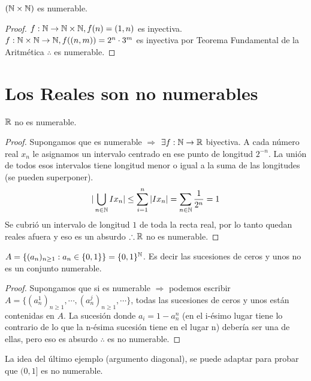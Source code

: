 \begin{eg}
    $(\mathbb{N} \times \mathbb{N})$ es numerable.
    \begin{proof}
        $f: \mathbb{N} \to \mathbb{N}\times \mathbb{N}, f(n)=(1, n)$ es inyectiva.
        $f: \mathbb{N}\times \mathbb{N} \to \mathbb{N} , f((n, m))= 2^n \cdot 3^m$ es inyectiva por Teorema Fundamental de la Aritmética $\therefore$ es numerable.
    \end{proof}
\end{eg}

\section{Los Reales son no numerables}

\begin{theorem}
    $\mathbb{R}$  no es numerable.
    \begin{proof}
        Supongamos que es numerable $\Rightarrow$
        $\exists f: \mathbb{N} \to \mathbb{R}$ biyectiva. A cada número real $x_n$ le asignamos un intervalo centrado en ese punto de longitud $2^{-n}$. La unión de todos esos intervalos tiene longitud menor o igual a la suma de las longitudes (se pueden superponer).
        \begin{equation}
            |\bigcup_{n\in\mathbb{N}} Ix_n| \leq \sum_{i=1}^{n} |Ix_n| = \sum_{n \in \mathbb{N}}\dfrac{1}{2^n} = 1
        \end{equation}
        Se cubrió un intervalo de longitud $1$ de toda la recta real, por lo tanto quedan reales afuera y eso es un absurdo $\therefore \mathbb{R}$ no es numerable.
    \end{proof}
\end{theorem}

\begin{eg}
    $A = \{ (a_n)_{n \geq 1} : a_n \in \{0, 1\}\} = \{0, 1\}^{\mathbb{N}}$. Es decir las sucesiones de ceros y unos no es un conjunto numerable.
    \begin{proof}
        Supongamos que si es numerable $\Rightarrow$ podemos escribir \\ $A = \{ (a_n^1)_{n\geq1}, \cdots, (a_n^j)_{n\geq1}, \cdots \}$, todas las sucesiones de ceros y unos están contenidas en $A$. La sucesión donde $a_i=1-a_n^n$ (en el i-ésimo lugar tiene lo contrario de lo que la n-ésima sucesión tiene en el lugar n) debería ser una de ellas, pero eso es absurdo $\therefore$ es no numerable.
    \end{proof}
\end{eg}

La idea del último ejemplo (argumento diagonal), se puede adaptar para probar que $(0, 1]$ es no numerable.

